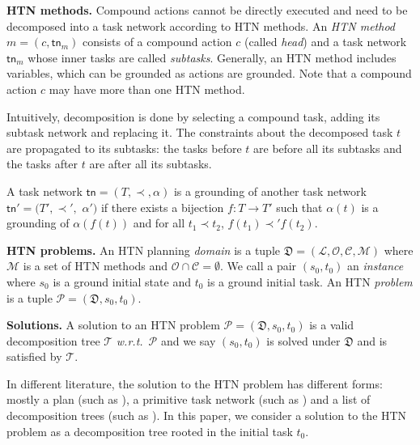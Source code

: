 \documentclass[letterpaper]{article} %
\newcommand{\Operators}{\mathcal{O}}
\newcommand{\Cactions}{\mathcal{C}}
\newcommand{\HtnDomain}{\mathfrak{D}}
\newcommand{\Methods}{\mathcal{M}}
\newcommand{\HtnProblem}{\mathcal{P}}
\newcommand{\Lvar}{\mathcal{L}}
\renewcommand{\P}{\mathcal{P}}
\newcommand{\Constraint}{\prec}
\newcommand{\tn}{\mathsf{tn}}
\newcommand{\Dtree}{\mathcal{T}}
\begin{document}
\smallskip
\noindent\textbf{HTN methods.}
Compound actions cannot be directly executed and need to be decomposed into a task network according to HTN methods.
An \emph{HTN method} $m{=}(c,{\tn_m})$ consists of %
a compound action $c$ (called \emph{head}) and a task network ${\tn_m}$ whose inner tasks are called \emph{subtasks}.
Generally, an HTN method includes variables, which can be grounded as actions are grounded.
Note that a compound action $c$ may have more than one HTN method. %

Intuitively, decomposition is done by selecting a compound task, adding its subtask network and replacing it.
The constraints about the decomposed task $t$ are propagated to its subtasks: the tasks before $t$ are before all its subtasks and the tasks after $t$ are after all its subtasks.


A task network $\tn \!= \!(T,\Constraint,\alpha)$ is a grounding of another task network $\tn'\!= \!(T',\Constraint',$ $\alpha')$ if
there exists a bijection $f\!:\! T \!\longrightarrow\! T'$ such that
$\alpha(t)$ is a grounding of $\alpha(f(t))$ and for all $t_1 \Constraint t_2$, $f(t_1){\Constraint'} f(t_2)$.

\smallskip
\noindent\textbf{HTN problems.}
An HTN planning \emph{domain} is a tuple $\HtnDomain=(\Lvar,\Operators,\Cactions,\Methods)$ where $\Methods$ is a set of HTN methods and $\Operators \cap \Cactions =\emptyset$.
We call a pair $(s_0,t_0)$ an \emph{instance} where $s_0$ is a ground initial state and $t_0$ is a ground initial task.
An HTN \emph{problem} is a tuple $\P= (\HtnDomain,s_0,t_0)$. %














\smallskip
\noindent\textbf{Solutions.}
A solution to an HTN problem $\HtnProblem = (\HtnDomain,s_0,t_0)$ is a valid decomposition tree $\Dtree$ \emph{w.r.t.}\ $\HtnProblem$ and
we say $(s_0,t_0)$ is solved under $\HtnDomain$ and is satisfied by $\Dtree$.

In different literature, the solution to the HTN problem has different forms: mostly a plan (such as \cite{erol1994htn}), a primitive task network (such as \cite{Behnke2017}) and a list of decomposition trees (such as \cite{DBLP:journals/ai/ZhuoM014}).
In this paper, we consider a solution to the HTN problem as a decomposition tree rooted in the initial task $t_0$.
\end{document}
